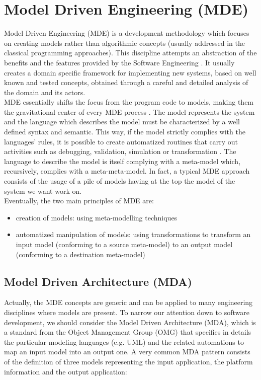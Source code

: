 \section{Model Driven Engineering (MDE)}
\label{ModelDrivenEngineering}
Model Driven Engineering (MDE) is a development methodology which focuses on creating models rather than algorithmic concepts (usually addressed in the classical programming approaches).
This discipline attempts an abstraction of the benefits and the features provided by the Software Engineering \cite{Marrone}. It usually creates a domain specific framework for implementing new systems, based on well known and tested concepts, obtained through a careful and detailed analysis of the domain and its actors.\\
%
MDE essentially shifts the focus from the program code to models, making them the gravitational center of every MDE process \cite{Lukman08}. The model represents the system and the language which describes the model must be characterized by a well defined syntax and semantic. This way, if the model strictly complies with the languages' rules, it is possible to create automatized routines that carry out activities such as debugging, validation, simulation or transformation \cite{Papa11}. 
The language to describe the model is itself complying with a meta-model which, recursively, complies with a meta-meta-model. In fact, a typical MDE approach consists of the usage of a pile of models having at the top the model of the system we want work on. \\
%
Eventually, the two main principles of MDE are:
\begin{itemize}
 \item creation of models: using meta-modelling techniques
 \item automatized manipulation of models: using transformations to transform an input model (conforming to a source meta-model) to an output model (conforming to a destination meta-model)
\end{itemize}

\subsection{Model Driven Architecture (MDA)}
\label{MDA}
Actually, the MDE concepts are generic and can be applied to many engineering disciplines where models are present. To narrow our attention down to software development, we should consider the Model Driven Architecture (MDA), which is a standard from the Object Management Group (OMG) that specifies in details the particular modeling languages (e.g. UML) and the related automations to map an input model into an output one.
A very common MDA pattern consists of the definition of three models \cite{Marrone} representing the input application, the platform information and the output application:

